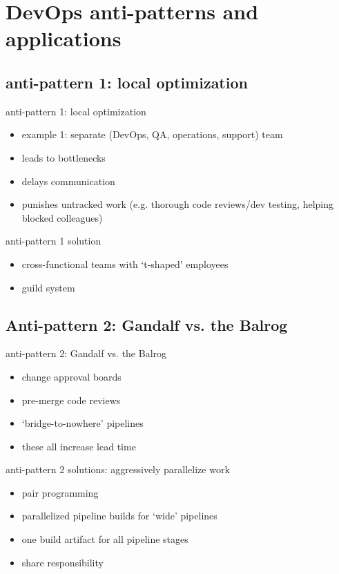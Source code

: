 \documentclass{beamer}
\begin{document}
	\section{DevOps anti-patterns and applications}
	\subsection{anti-pattern 1: local optimization}
	\begin{frame}{anti-pattern 1: local optimization}
		\begin{itemize}
			\item example 1: separate (DevOps, QA, operations, support) team \pause
			\item leads to bottlenecks \pause
			\item delays communication 
			\item punishes untracked work (e.g. thorough code reviews/dev testing, helping blocked colleagues)
		\end{itemize}
	\end{frame}
	\begin{frame}{anti-pattern 1 solution}
		\begin{itemize}
			\item cross-functional teams with `t-shaped' employees \pause
			\item guild system 
		\end{itemize}
	\end{frame}
	\subsection{Anti-pattern 2: Gandalf vs. the Balrog}
	\begin{frame}{anti-pattern 2: Gandalf vs. the Balrog}
		\begin{itemize}
			\item change approval boards \pause 
			\item pre-merge code reviews \pause 
			\item `bridge-to-nowhere' pipelines 
			\item these all increase lead time
		\end{itemize}
	\end{frame}
	\begin{frame}{anti-pattern 2 solutions: aggressively parallelize work}
		\begin{itemize}
			\item pair programming \pause 
			\item parallelized pipeline builds for `wide' pipelines \pause
			\item one build artifact for all pipeline stages 
			\item share responsibility
		\end{itemize}
	\end{frame}
\end{document}
